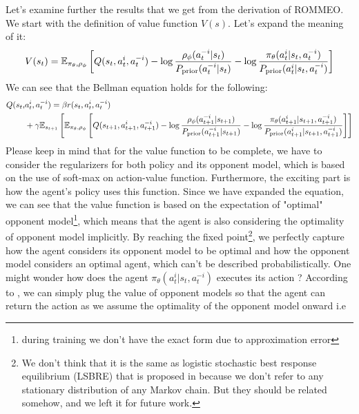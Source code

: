 Let's examine further the results that we get from the derivation of ROMMEO. We start with the definition of value function $V(s)$. Let's expand the meaning of it:
\begin{equation}
    V(s_{t}) =\mathbb{E}_{\pi_\theta, \rho_\phi}\left[ Q(s_t, a^i_t, a^{-i}_t) - \log\frac{\rho_\phi(a^{-i}_t | s_t)}{P_{\text{prior}}(a^{-i}_t | s_t)} - \log\frac{\pi_{\theta}(a^i_t | s_t, a^{-i}_t) }{P_{\text{prior}}(a^i_t | s_t, a^{-i}_t)} \right]
\end{equation}
We can see that the Bellman equation holds for the following:
\begin{equation}
\begin{aligned}
\label{eqn:chap3-rollout-Q}
    Q(s_{t},& a^i_{t}, a^{-i}_{t}) = \beta r(s_t, a^i_t, a^{-i}_t) \\
    &+ \gamma\mathbb{E}_{s_{t+1}}\left[ \mathbb{E}_{\pi_\theta, \rho_\phi}\left[ Q(s_{t+1}, a^i_{t+1}, a^{-i}_{t+1}) - \log\frac{\rho_\phi(a^{-i}_{t+1} | s_{t+1})}{P_{\text{prior}}(a^{-i}_{t+1} | s_{t+1})} - \log\frac{\pi_{\theta}(a^i_{t+1} | s_{t+1}, a^{-i}_{t+1}) }{P_{\text{prior}}(a^i_{t+1} | s_{t+1}, a^{-i}_{t+1})} \right] \right]
\end{aligned}
\end{equation}
Please keep in mind that for the value function to be complete, we have to consider the regularizers for both policy and its opponent model, which is based on the use of soft-max on action-value function. Furthermore, the exciting part is how the agent's policy uses this function. Since we have expanded the equation, we can see that the value function is based on the expectation of "optimal" opponent model\footnote{during training we don't have the exact form due to approximation error}, which means that the agent is also considering the optimality of opponent model implicitly. By reaching the fixed point\footnote{We don't think that it is the same as logistic stochastic best response equilibrium (LSBRE) that is proposed in \cite{yu2019multi} because we don't refer to any stationary distribution of any Markov chain. But they should be related somehow, and we left it for future work.}, we perfectly capture how the agent considers its opponent model to be optimal and how the opponent model considers an optimal agent, which can't be described probabilistically. One might wonder how does the agent $\pi_\theta(a^i_t | s_t, a^{-i}_t)$ executes its action ? According to \cite{tian2019regularized}, we can simply plug the value of opponent models so that the agent can return the action as we assume the optimality of the opponent model onward i.e 
